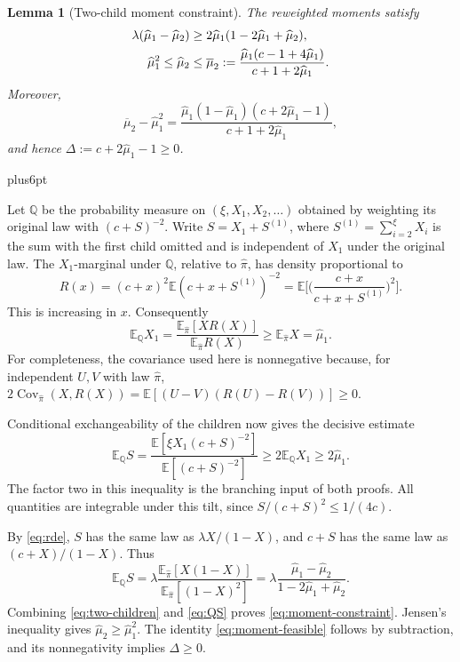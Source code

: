 \documentclass[11pt,reqno]{amsart}
\makeatletter
\theoremstyle{plain}
\newtheorem{lemma}[theorem]{Lemma}
\theoremstyle{definition}
\theoremstyle{remark}
\renewenvironment{proof}[1][\proofname]{%
  \par
  \pushQED{\qed}%
  \normalfont
  \topsep6pt plus6pt\relax
  \trivlist
  \item[\hskip\labelsep\slshape #1\@addpunct{.}]%
  \ignorespaces
}{%
  \popQED
  \endtrivlist
  \@endpefalse
}
\DeclareRobustCommand{\qed}{%
  \leavevmode\unskip\penalty9999\hbox{}\nobreak
  \ifmmode
    \makebox[0pt][l]{\qquad\hbox{\qedsymbol}}%
  \else
    \qquad\hbox{\qedsymbol}%
  \fi
}
\renewcommand{\qedsymbol}{\rule[.47pt]{4pt}{6pt}}
\numberwithin{equation}{section}
\newcommand{\E}{\mathbb E}
\newcommand{\Cov}{\operatorname{Cov}}
\makeatother
\begin{document}
\begin{lemma}[Two-child moment constraint]\label{lem:two-child}
The reweighted moments satisfy
\begin{align}
 \lambda(\widehat\mu_1-\widehat\mu_2)
 &\ge2\widehat\mu_1(1-2\widehat\mu_1+\widehat\mu_2),\notag\\
 \widehat\mu_1^2\le\widehat\mu_2&\le\overline\mu_2
 :=\frac{\widehat\mu_1(c-1+4\widehat\mu_1)}{c+1+2\widehat\mu_1}.
 \label{eq:moment-constraint}
\end{align}
Moreover,
\begin{equation}\label{eq:moment-feasible}
 \overline\mu_2-\widehat\mu_1^2
 =\frac{\widehat\mu_1(1-\widehat\mu_1)(c+2\widehat\mu_1-1)}
        {c+1+2\widehat\mu_1},
\end{equation}
and hence $\Delta:=c+2\widehat\mu_1-1\ge0$.
\end{lemma}

\begin{proof}
Let $\mathbb Q$ be the probability measure on $(\xi,X_1,X_2,\ldots)$ obtained by
weighting its original law with $(c+S)^{-2}$. Write
$S=X_1+S^{(1)}$, where $S^{(1)}=\sum_{i=2}^{\xi}X_i$ is the sum with the
first child omitted and is independent of $X_1$ under the original law.
The $X_1$-marginal under $\mathbb Q$, relative to $\widehat\pi$, has density proportional to
\begin{equation}\label{eq:tilt-ratio}
 R(x)=(c+x)^2\E(c+x+S^{(1)})^{-2}
     =\E\biggl[\biggl(\frac{c+x}{c+x+S^{(1)}}\biggr)^2\biggr].
\end{equation}
This is increasing in $x$. Consequently
\begin{equation}\label{eq:first-child}
 \E_{\mathbb Q}X_1=\frac{\E_{\widehat\pi}[XR(X)]}{\E_{\widehat\pi}R(X)}\ge \E_{\widehat\pi}X=\widehat\mu_1.
\end{equation}
For completeness, the covariance used here is nonnegative because, for
independent $U,V$ with law $\widehat\pi$,
$2\Cov_{\widehat\pi}(X,R(X))=\E[(U-V)(R(U)-R(V))]\ge0$.

Conditional exchangeability of the children now gives the decisive estimate
\begin{equation}\label{eq:two-children}
 \boxed{\quad
 \E_{\mathbb Q}S
 =\frac{\E[\xi X_1(c+S)^{-2}]}{\E[(c+S)^{-2}]}
 \ge2\E_{\mathbb Q}X_1\ge2\widehat\mu_1.
 \quad}
\end{equation}
The factor two in this inequality is the branching input of both proofs.
All quantities are integrable under this tilt, since
$S/(c+S)^2\le1/(4c)$.

By \eqref{eq:rde}, $S$ has the same law as $\lambda X/(1-X)$, and
$c+S$ has the same law as $(c+X)/(1-X)$. Thus
\begin{equation}\label{eq:QS}
 \E_{\mathbb Q}S=\lambda\frac{\E_{\widehat\pi}[X(1-X)]}{\E_{\widehat\pi}[(1-X)^2]}
     =\lambda\frac{\widehat\mu_1-\widehat\mu_2}{1-2\widehat\mu_1+\widehat\mu_2}.
\end{equation}
Combining \eqref{eq:two-children} and \eqref{eq:QS} proves
\eqref{eq:moment-constraint}. Jensen's inequality gives
$\widehat\mu_2\ge\widehat\mu_1^2$. The identity
\eqref{eq:moment-feasible} follows by subtraction, and its nonnegativity
implies $\Delta\ge0$.
\end{proof}
\end{document}
